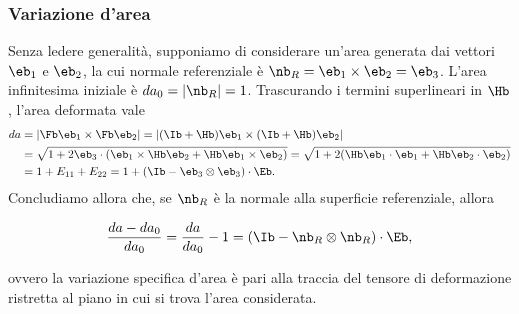 \subsubsection{Variazione d'area}
Senza ledere generalità, supponiamo di considerare un'area generata dai vettori $\eb_1$ e $\eb_2$, la cui normale referenziale è $\nb_R=\eb_1\times\eb_2=\eb_3$. L'area infinitesima iniziale è $da_0=|\nb_R|=1$. Trascurando i termini superlineari in $\Hb$, l'area deformata vale
\begin{equation}
\begin{aligned}
	da&=|\Fb\eb_1\times\Fb\eb_2|=|(\Ib+\Hb)\eb_1\times(\Ib+\Hb)\eb_2|\\
	&=\sqrt{1+2\eb_3\cdot(\eb_1\times\Hb\eb_2+\Hb\eb_1\times\eb_2)}=\sqrt{1+2(\Hb\eb_1\cdot\eb_1+\Hb\eb_2\cdot\eb_2)}\\
	&=1+E_{11}+E_{22}=1+(\Ib-\eb_3\otimes\eb_3)\cdot\Eb.
\end{aligned}
\end{equation}
Concludiamo allora che, se $\nb_R$ è la normale alla superficie referenziale, allora
\begin{definition}
	\begin{equation}\label{da}
\frac{da-da_0}{da_0}=\frac{da}{da_0}-1=(\Ib-\nb_R\otimes\nb_R)\cdot\Eb,
\end{equation}
\end{definition}
ovvero la variazione specifica d'area è pari alla traccia del tensore di deformazione ristretta al piano in cui si trova l'area considerata.

